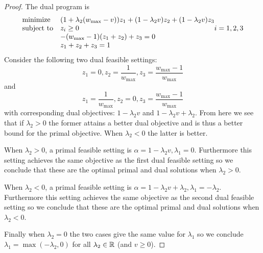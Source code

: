 \begin{proof}
The dual program is
\begin{equation*}
\begin{array}{ll@{}ll}
\text{minimize}  & (1+\lambda_2(w_{\max}-v))z_1 +(1-\lambda_2 v) z_2 + (1-\lambda_2 v) z_3 &\\
\text{subject to}& z_i \geq 0  & i=1,2,3 \\
                 & -(w_{\max}-1)(z_1+z_2)+z_3 = 0 \\
                 & z_1+z_2+z_3=1 \\
\end{array}
\end{equation*}
Consider the following two dual feasible settings:
\[
z_1=0,z_2=\frac{1}{w_{\max}}, z_3=\frac{w_{\max}-1}{w_{\max}}
\]
and 
\[
z_1=\frac{1}{w_{\max}}, z_2=0, z_3=\frac{w_{\max}-1}{w_{\max}}
\]
with corresponding dual objectives: $1-\lambda_2 v$ and $1-\lambda_2 v + \lambda_2$. From here we see that if $\lambda_2 > 0$ the former attains a
better dual objective and is thus a better bound
for the primal objective. When $\lambda_2<0$ the latter
is better. 

When $\lambda_2>0$, a primal feasible setting is
$\alpha=1-\lambda_2 v,\lambda_1=0$. Furthermore this setting
achieves the same objective as the first dual feasible setting so 
we conclude that these are the optimal primal and dual solutions when $\lambda_2>0$.

When $\lambda_2<0$, a primal feasible setting is 
$\alpha=1-\lambda_2 v +\lambda_2, \lambda_1=-\lambda_2$. Furthermore this setting
achieves the same objective as the second dual feasible setting
so we conclude that these are the optimal primal and dual solutions when $\lambda_2<0$. 

Finally when $\lambda_2=0$ the two cases give the same value for $\lambda_1$ so we conclude $\lambda_1=\max(-\lambda_2,0)$ for all $\lambda_2 \in \mathbb{R}$ (and $v\geq 0$).
\end{proof}

